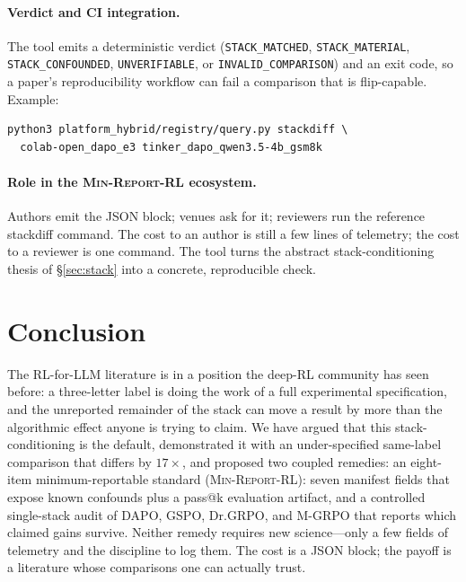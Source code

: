\documentclass[11pt]{article}
\newcommand{\minreport}{\textsc{Min-Report-RL}}
\begin{document}
\paragraph{Verdict and CI integration.} The tool emits a deterministic verdict
(\texttt{STACK\_MATCHED}, \texttt{STACK\_MATERIAL}, \texttt{STACK\_CONFOUNDED},
\texttt{UNVERIFIABLE}, or \texttt{INVALID\_COMPARISON}) and an exit code, so a
paper's reproducibility workflow can fail a comparison that is
flip-capable. Example:
\begin{verbatim}
python3 platform_hybrid/registry/query.py stackdiff \
  colab-open_dapo_e3 tinker_dapo_qwen3.5-4b_gsm8k
\end{verbatim}

\paragraph{Role in the \minreport{} ecosystem.} Authors emit the JSON block;
venues ask for it; reviewers run the reference stackdiff command. The cost to an author
is still a few lines of telemetry; the cost to a reviewer is one command. The
tool turns the abstract stack-conditioning thesis of \S\ref{sec:stack} into a
concrete, reproducible check.

\section{Conclusion}
\label{sec:conclusion}

The RL-for-LLM literature is in a position the deep-RL community has seen
before: a three-letter label is doing the work of a full experimental
specification, and the unreported remainder of the stack can move a result by
more than the algorithmic effect anyone is trying to claim. We have argued that
this stack-conditioning is the default, demonstrated it with an under-specified
same-label comparison that differs by $17\times$, and proposed two coupled remedies: an
eight-item minimum-reportable standard (\minreport{}): seven manifest fields
that expose known confounds plus a pass@k evaluation artifact, and a controlled
single-stack audit of DAPO, GSPO,
Dr.GRPO, and M-GRPO that reports which claimed gains survive. Neither remedy
requires new science---only a few fields of telemetry and the discipline to log
them. The cost is a JSON block; the payoff is a literature whose comparisons one
can actually trust.
\end{document}
